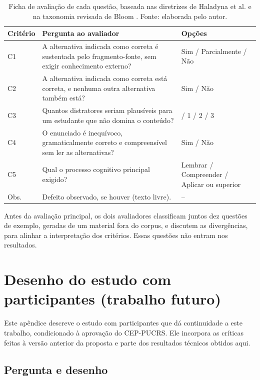 \begin{table}[htbp]
\centering
\caption{Ficha de avaliação de cada questão, baseada nas diretrizes de Haladyna et al. e na taxonomia revisada de Bloom \cite{AK01}. Fonte: elaborada pelo autor.}
\label{tab:rubrica}
\small
\begin{tabularx}{\textwidth}{l >{\raggedright\arraybackslash}X >{\raggedright\arraybackslash}p{3.8cm}}
\toprule
Critério & Pergunta ao avaliador & Opções \\
\midrule
C1 & A alternativa indicada como correta é sustentada pelo fragmento-fonte, sem exigir conhecimento externo? & Sim / Parcialmente / Não \\
C2 & A alternativa indicada como correta está correta, e nenhuma outra alternativa também está? & Sim / Não \\
C3 & Quantos distratores seriam plausíveis para um estudante que não domina o conteúdo? & 0 / 1 / 2 / 3 \\
C4 & O enunciado é inequívoco, gramaticalmente correto e compreensível sem ler as alternativas? & Sim / Não \\
C5 & Qual o processo cognitivo principal exigido? & Lembrar / Compreender / Aplicar ou superior \\
Obs. & Defeito observado, se houver (texto livre). & -- \\
\bottomrule
\end{tabularx}
\end{table}

Antes da avaliação principal, os dois avaliadores classificam juntos dez questões de exemplo, geradas de um material fora do corpus, e discutem as divergências, para alinhar a interpretação dos critérios. Essas questões não entram nos resultados.

\chapter{\label{ap:usuarios}Desenho do estudo com participantes (trabalho futuro)}

Este apêndice descreve o estudo com participantes que dá continuidade a este trabalho, condicionado à aprovação do CEP-PUCRS. Ele incorpora as críticas feitas à versão anterior da proposta e parte dos resultados técnicos obtidos aqui.

\section{Pergunta e desenho}

